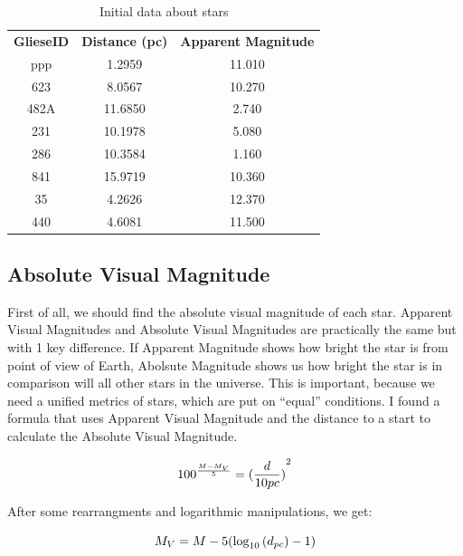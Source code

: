 \documentclass[a4paper,12pt]{article}
\begin{document}
  \begin{table}[h!]
    \begin{center}
      \caption{Initial data about stars}
      \begin{tabular}{c | c | c}
        \textbf{GlieseID} & \textbf{Distance (pc)} & \textbf{Apparent Magnitude} \\ppp
        \hline
        551 & 1.2959 & 11.010\\
        623 & 8.0567 & 10.270\\
        482A & 11.6850 & 2.740\\
        231 & 10.1978 & 5.080\\
        286 & 10.3584 & 1.160\\
        841 & 15.9719 & 10.360\\
        35 & 4.2626 & 12.370\\
        440 & 4.6081 & 11.500\\
      \end{tabular}
      \label{data}
    \end{center}
  \end{table}
  
  \subsection{Absolute Visual Magnitude}

  First of all, we should find the absolute visual magnitude of each star. Apparent Visual Magnitudes and Absolute Visual Magnitudes are practically the same but with 1 key difference. If Apparent Magnitude shows how bright the star is from point of view of Earth, Abolsute Magnitude shows us how bright the star is in comparison will all other stars in the universe. This is important, because we need a unified metrics of stars, which are put on ``equal'' conditions. I found a formula that uses Apparent Visual Magnitude and the distance to a start to calculate the Absolute Visual Magnitude. 
  
  \begin{equation}
    {100}^{\frac{M-M_V}{5}} = {(\frac{d}{10pc})}^2\\
  \end{equation}

  After some rearrangments and logarithmic manipulations, we get:

  \begin{equation}
    M_V = M - 5(\log_{10}{(d_{pc})}-1)\\
    \end{equation}
    
\end{document}
